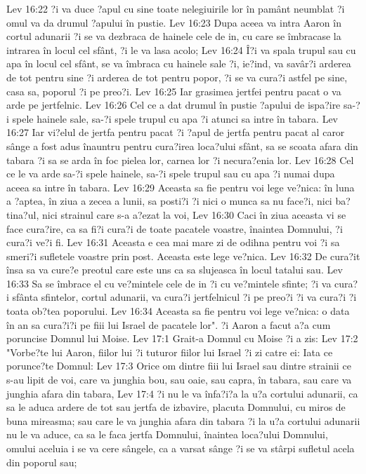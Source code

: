 Lev 16:22  ?i va duce ?apul cu sine toate nelegiuirile lor în pamânt neumblat ?i omul va da drumul ?apului în pustie.
Lev 16:23  Dupa aceea va intra Aaron în cortul adunarii ?i se va dezbraca de hainele cele de in, cu care se îmbracase la intrarea în locul cel sfânt, ?i le va lasa acolo;
Lev 16:24  Î?i va spala trupul sau cu apa în locul cel sfânt, se va îmbraca cu hainele sale ?i, ie?ind, va savâr?i arderea de tot pentru sine ?i arderea de tot pentru popor, ?i se va cura?i astfel pe sine, casa sa, poporul ?i pe preo?i.
Lev 16:25  Iar grasimea jertfei pentru pacat o va arde pe jertfelnic.
Lev 16:26  Cel ce a dat drumul în pustie ?apului de ispa?ire sa-?i spele hainele sale, sa-?i spele trupul cu apa ?i atunci sa intre în tabara.
Lev 16:27  Iar vi?elul de jertfa pentru pacat ?i ?apul de jertfa pentru pacat al caror sânge a fost adus înauntru pentru cura?irea loca?ului sfânt, sa se scoata afara din tabara ?i sa se arda în foc pielea lor, carnea lor ?i necura?enia lor.
Lev 16:28  Cel ce le va arde sa-?i spele hainele, sa-?i spele trupul sau cu apa ?i numai dupa aceea sa intre în tabara.
Lev 16:29  Aceasta sa fie pentru voi lege ve?nica: în luna a ?aptea, în ziua a zecea a lunii, sa posti?i ?i nici o munca sa nu face?i, nici ba?tina?ul, nici strainul care s-a a?ezat la voi,
Lev 16:30  Caci în ziua aceasta vi se face cura?ire, ca sa fi?i cura?i de toate pacatele voastre, înaintea Domnului, ?i cura?i ve?i fi.
Lev 16:31  Aceasta e cea mai mare zi de odihna pentru voi ?i sa smeri?i sufletele voastre prin post. Aceasta este lege ve?nica.
Lev 16:32  De cura?it însa sa va cure?e preotul care este uns ca sa slujeasca în locul tatalui sau.
Lev 16:33  Sa se îmbrace el cu ve?mintele cele de in ?i cu ve?mintele sfinte; ?i va cura?i sfânta sfintelor, cortul adunarii, va cura?i jertfelnicul ?i pe preo?i ?i va cura?i ?i toata ob?tea poporului.
Lev 16:34  Aceasta sa fie pentru voi lege ve?nica: o data în an sa cura?i?i pe fiii lui Israel de pacatele lor". ?i Aaron a facut a?a cum poruncise Domnul lui Moise.
Lev 17:1  Grait-a Domnul cu Moise ?i a zis:
Lev 17:2  "Vorbe?te lui Aaron, fiilor lui ?i tuturor fiilor lui Israel ?i zi catre ei: Iata ce porunce?te Domnul:
Lev 17:3  Orice om dintre fiii lui Israel sau dintre strainii ce s-au lipit de voi, care va junghia bou, sau oaie, sau capra, în tabara, sau care va junghia afara din tabara,
Lev 17:4  ?i nu le va înfa?i?a la u?a cortului adunarii, ca sa le aduca ardere de tot sau jertfa de izbavire, placuta Domnului, cu miros de buna mireasma; sau care le va junghia afara din tabara ?i la u?a cortului adunarii nu le va aduce, ca sa le faca jertfa Domnului, înaintea loca?ului Domnului, omului aceluia i se va cere sângele, ca a varsat sânge ?i se va stârpi sufletul acela din poporul sau;
